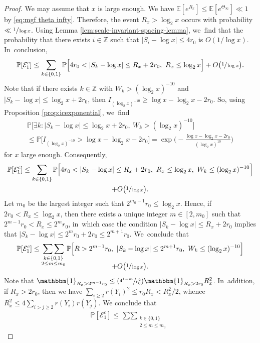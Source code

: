 \documentclass[10pt,a4paper]{article}
\newcommand{\Psfrac}[2]{(\sfrac{#1}{#2})}
\newcommand{\ZZ}{\mathbb{Z}}
\newcommand{\PP}{\mathbb{P}}
\newcommand{\EE}{\mathbb{E}}
\newcommand{\one}{\mathbbm{1}}
\newcommand{\EC}{\mathcal{E}}
\newcommand{\bg}{\big}
\newcommand{\bgg}{\Big}
\theoremstyle{plain}
\theoremstyle{definition}
\begin{document}
\begin{proof} We may assume that $x$ is large enough.
We have $\EE[e^{R_x}]\le \EE[e^{\Theta_\infty}] \ll 1$ by \eqref{eq:mgf theta infty}. Therefore, the event $R_x > \log_2 x$ occurs with probability $\ll\sfrac{1}{\log x}$. Using Lemma \ref{lem:scale-invariant-spacing-lemma}, we~find that the probability that there exists $i\in\ZZ$ such that $|S_i-\log x|\le 4r_0$ is $O(1/\log x)$. In~conclusion,
\[
\PP[\EC_1^c] \le \sum_{k\in\{0,1\}} \PP\bgg[4r_0<|S_k-\log x|\le R_x+2r_0,\ R_x\le \log_2x \bgg] +O\bg(\sfrac{1}{\log x}\bg).
\]
\pagebreak[2]
Note that if there exists $k \in \ZZ$ with $W_k>(\log_2x)^{-10}$ and $|S_k-\log x|\le \log_2x + 2r_0$, then $I_{(\log_2x)^{-10}}\ge \log x-\log_2x-2r_0$. So, using Proposition \ref{prop:icexponential}, we~find
\begin{multline*}
\PP\bgg[\exists k: |S_k-\log x|\le \log_2x+2r_0,\ W_k>(\log_2x)^{-10} \bgg] \\
\le \PP\bg[I_{(\log_2 x)^{-10}} > \log x-\log_2x-2r_0\bg]
= \exp\!\bgg(\!-\frac{\log x-\log_2x-2r_0}{(\log_2x)^{10}}\bgg)
\end{multline*}
for $x$ large enough. Consequently,
\begin{multline*}
\PP[\EC_1^c] \le \sum_{k\in\{0,1\}} \PP\bgg[4r_0<|S_k-\log x|\le R_x+2r_0,\ R_x\le \log_2x,\ W_k\le(\log_2x)^{-10} \bgg] \\
+ O\bg(\sfrac{1}{\log x}\bg).
\end{multline*}
Let $m_0$ be the largest integer such that $2^{m_0-1}r_0\le \log_2x$. Hence, if $2r_0<R_x\le\log_2x$, then there exists a unique integer $m\!\in\![2,m_0]$ such that $2^{m-1}r_0\!<\!R_x\!\le\! 2^mr_0$, in~which case the condition $|S_k-\log x|\!\le\! R_x+2r_0$ implies that $|S_k-\log x|\!\le\! 2^mr_0 +2r_0\!\le\! 2^{m+1}r_0$. We~conclude that
\begin{multline*}
\PP[\EC_1^c]
\le \mathop{\sum\sum}_{\substack{k\in\{0,1\} \\ 2\le m\le m_0} }
\PP\bgg[R> 2^{m-1}r_0,\ |S_k-\log x|\le 2^{m+1}r_0,\ W_k \le (\log_2 x)^{-10} \bgg] \\[-10pt]
+O\bg(\sfrac{1}{\log x}\bg).
\end{multline*}
Note that $\one_{R_x > 2^{m-1}r_0}\le \Psfrac{4^{1-m}}{r_0^2} \one_{R_x>2r_0}R_x^2$. In~addition, if $R_x>2r_0$, then we have $\sum_{i\ge2}r(Y_i)^2\le r_0R_x<R_x^2/2$, whence $R_x^2\le 4\sum_{i>j\ge2}r(Y_i)r(Y_j)$.
We conclude that
\begin{multline*}
\PP[\EC_1^c]\le \mathop{\sum\sum}_{\substack{k\in\{0,1\} \\ 2\le m\le m_0} }

\end{multline*}
\end{proof}
\end{document}
